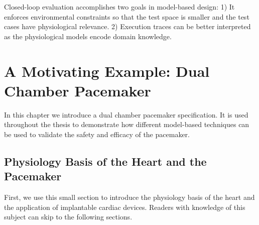 Closed-loop evaluation accomplishes two goals in model-based design: 1) It enforces environmental constraints so that the test space is smaller and the test cases have physiological relevance. 2) Execution traces can be better interpreted as the physiological models encode domain knowledge. 

\chapter{A Motivating Example: Dual Chamber Pacemaker}
In this chapter we introduce a dual chamber pacemaker specification.
It is used throughout the thesis to demonstrate how different model-based techniques can be used to validate the safety and efficacy of the pacemaker.
\section{Physiology Basis of the Heart and the Pacemaker}
First, we use this small section to introduce the physiology basis of the heart and the application of implantable cardiac devices. Readers with knowledge of this subject can skip to the following sections.
